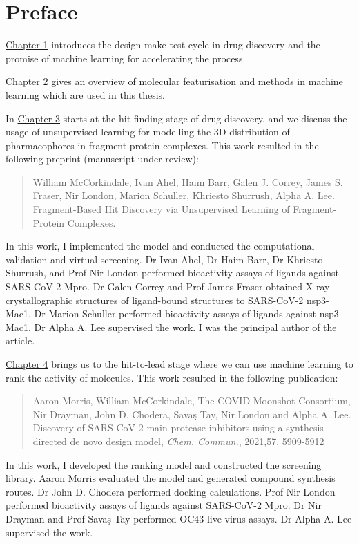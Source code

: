 \chapter*{Preface}
\hyperref[ch:intro]{Chapter 1} introduces the design-make-test cycle in drug discovery and the promise of machine learning for accelerating the process.

\hyperref[ch:background]{Chapter 2} gives an overview of molecular featurisation and methods in machine learning which are used in this thesis.

In \hyperref[ch:fresco]{Chapter 3} starts at the hit-finding stage of drug discovery, and we discuss the usage of unsupervised learning for modelling the 3D distribution of pharmacophores in fragment-protein complexes. This work resulted in the following preprint (manuscript under review):
\begin{quote}
William McCorkindale, Ivan Ahel, Haim Barr, Galen J. Correy, James S. Fraser, Nir London, Marion Schuller, Khriesto Shurrush, Alpha A. Lee. Fragment-Based Hit Discovery via Unsupervised Learning of Fragment-Protein Complexes.
\end{quote}
In this work, I implemented the model and conducted the computational validation and virtual screening. Dr Ivan Ahel, Dr Haim Barr, Dr Khriesto Shurrush, and Prof Nir London performed bioactivity assays of ligands against SARS-CoV-2 Mpro. Dr Galen Correy and Prof James Fraser obtained X-ray crystallographic structures of ligand-bound structures to SARS-CoV-2 nsp3-Mac1. Dr Marion Schuller performed bioactivity assays of ligands against nsp3-Mac1. Dr Alpha A. Lee supervised the work. I was the principal author of the article.

\hyperref[ch:ranking]{Chapter 4} brings us to the hit-to-lead stage where we can use machine learning to rank the activity of molecules. This work resulted in the following publication:
\begin{quote}
Aaron Morris, William McCorkindale, The COVID Moonshot Consortium, Nir Drayman, John D. Chodera, Savaş Tay, Nir London and Alpha A. Lee. Discovery of SARS-CoV-2 main protease inhibitors using a synthesis-directed de novo design model, \textit{Chem. Commun.}, 2021,57, 5909-5912 
\end{quote}
In this work, I developed the ranking model and constructed the screening library. Aaron Morris evaluated the model and generated compound synthesis routes. Dr John D. Chodera performed docking calculations. Prof Nir London performed bioactivity assays of ligands against SARS-CoV-2 Mpro. Dr Nir Drayman and Prof Savaş Tay performed OC43 live virus assays.  Dr Alpha A. Lee supervised the work.

